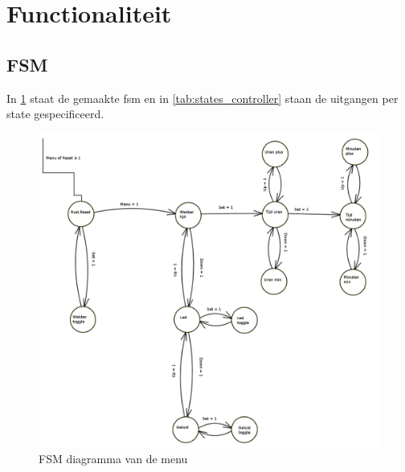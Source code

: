 \section{Functionaliteit}

\subsection{FSM}
In \cref{fig:FSM_controller} staat de gemaakte fsm en in \cref{tab:states_controller} staan de uitgangen per state gespecificeerd.

\begin{figure}[ht!]
\includegraphics[width=\textwidth,height=\textheight,keepaspectratio]{Figuren/Controller/FSM_controller.png}
\caption{FSM diagramma van de menu}
\label{fig:FSM_controller}
\end{figure}


